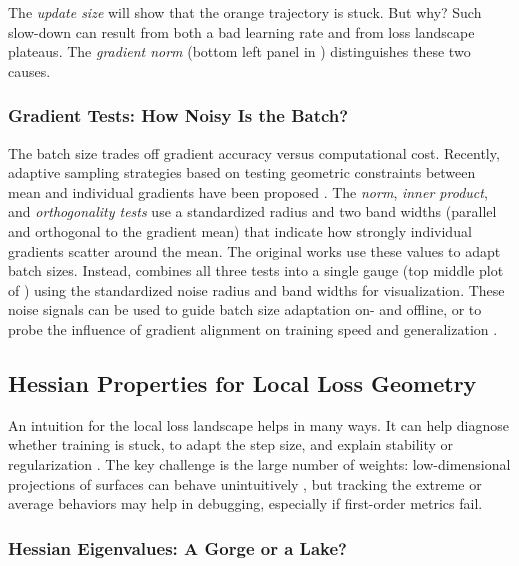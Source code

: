 The \textit{update size} will show that the orange trajectory is stuck. But why?
Such slow-down can result from both a bad learning rate and from loss landscape
plateaus. The \textit{gradient norm} (bottom left panel in
) distinguishes these two causes.

\subsubsection{Gradient Tests: How Noisy Is the Batch?}

The batch size trades off gradient accuracy versus computational cost. Recently,
adaptive sampling strategies based on testing geometric constraints between mean
and individual gradients have been proposed
\citep{byrd2012sample,bollapragada2017adaptive}. The \textit{norm},
\textit{inner product}, and \textit{orthogonality tests} use a standardized
radius and two band widths (parallel and orthogonal to the gradient mean) that
indicate how strongly individual gradients scatter around the mean. The original
works use these values to adapt batch sizes. Instead, \cockpit combines all
three tests into a single gauge (top middle plot of
) using the standardized noise radius and band
widths for visualization. These noise signals can be used to guide batch size
adaptation on- and offline, or to probe the influence of gradient alignment on
training speed \citep{sankararaman2020impact} and generalization
\citep{chatterjee2020coherent,chatterjee2020making,liu2020understanding}.

\subsection{Hessian Properties for Local Loss Geometry}\label{cockpit::sec:curvature}
An intuition for the local loss landscape helps in many ways. It can help
diagnose whether training is stuck, to adapt the step size, and explain
stability or regularization \citep{ginsburg2020regularization,jastrzebski2020break}. The key
challenge is the large number of weights: low-dimensional projections of
surfaces can behave unintuitively \citep{mulayoff2020unique}, but tracking the extreme
or average behaviors may help in debugging, especially if first-order metrics
fail.

\subsubsection{Hessian Eigenvalues: A Gorge or a Lake?}

